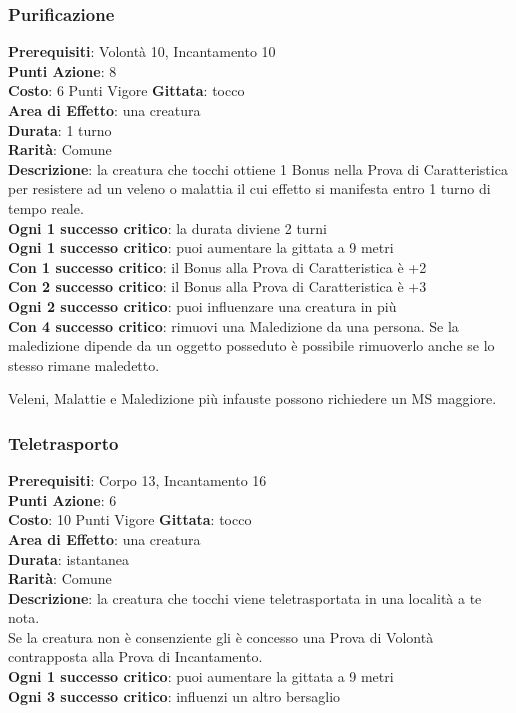 \documentclass[12pt,a4paper,twoside,openany]{book}
\begin{document}
\begin{multicols}{2}
\subsubsection*{Purificazione}
\textbf{Prerequisiti}: Volontà 10, Incantamento 10\\
\textbf{Punti Azione}: 8\\
\textbf{Costo}: 6 Punti Vigore
\textbf{Gittata}: tocco \\
\textbf{Area di Effetto}: una creatura\\
\textbf{Durata}: 1 turno\\
\textbf{Rarità}: Comune\\
\textbf{Descrizione}: la creatura che tocchi ottiene 1 Bonus nella Prova di Caratteristica per resistere ad un veleno o malattia il cui effetto si manifesta entro 1 turno di tempo reale.\\
\textbf{Ogni 1 successo critico}: la durata diviene 2 turni\\
\textbf{Ogni 1 successo critico}: puoi aumentare la gittata a 9 metri\\
\textbf{Con 1 successo critico}: il Bonus alla Prova di Caratteristica è +2\\
\textbf{Con 2 successo critico}: il Bonus alla Prova di Caratteristica è +3\\
\textbf{Ogni 2 successo critico}: puoi influenzare una creatura in più\\
\textbf{Con 4 successo critico}: rimuovi una Maledizione da una persona. Se la maledizione dipende da un oggetto posseduto è possibile rimuoverlo anche se lo stesso rimane maledetto. 

Veleni, Malattie e Maledizione più infauste possono richiedere un MS maggiore.

\subsubsection*{Teletrasporto}
\textbf{Prerequisiti}: Corpo 13, Incantamento 16\\
\textbf{Punti Azione}: 6\\
\textbf{Costo}: 10 Punti Vigore
\textbf{Gittata}: tocco \\
\textbf{Area di Effetto}: una creatura\\
\textbf{Durata}: istantanea\\
\textbf{Rarità}: Comune\\
\textbf{Descrizione}: la creatura che tocchi viene teletrasportata in una località a te nota.\\
Se la creatura non è consenziente gli è concesso una Prova di Volontà contrapposta alla Prova di Incantamento.\\
\textbf{Ogni 1 successo critico}: puoi aumentare la gittata a 9 metri\\
\textbf{Ogni 3 successo critico}: influenzi un altro bersaglio 


\end{multicols}
\end{document}
